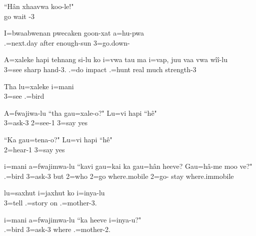 \ea
\gll ``Hân xhaavwa koo-le!"\\ go wait -3\\ \glt {}
\z

\ea
\gll I=bwaabwenan pwecaken goon-xat a=hu-pwa\\ .=next.day after enough-sun 3=go.down-\\ \glt {}
\z

\ea
\gll A=xaleke hapi tehnang si-lu ko i=vwa tau ma i=vap, juu vaa vwa wîî-lu\\ 3=see  sharp hand-3.  .=do impact  .=hunt real much  strength-3\\ \glt {}
\z

\ea
\gll Tha lu=xaleke i=mani\\  3=see .=bird\\ \glt {}
\z

\ea
\gll A=fwajiwa-lu ``tha gau=xale-o?" Lu=vi hapi ``hê"\\ 3=ask-3  2=see-1 3=say  yes\\ \glt {}
\z

\ea
\gll ``Ka gau=tena-o?" Lu=vi hapi ``hê"\\  2=hear-1 3=say  yes\\ \glt {}
\z

\ea 
\gll i=mani a=fwajimwa-lu ``kavi gau=kai ka gau=hân heeve? Gau=hâ-me moo ve?"\\ .=bird 3=ask-3 but 2=who  2=go where.mobile 2=go- stay where.immobile\\ \glt {}
\z

\ea
\gll lu=saxhut i=jaxhut ko i=inya-lu\\ 3=tell .=story on .=mother-3.\\ \glt {}
\z

\ea
\gll i=mani a=fwajimwa-lu ``ka heeve i=inya-u?"\\ .=bird 3=ask-3  where .=mother-2.\\ \glt {}
\z

